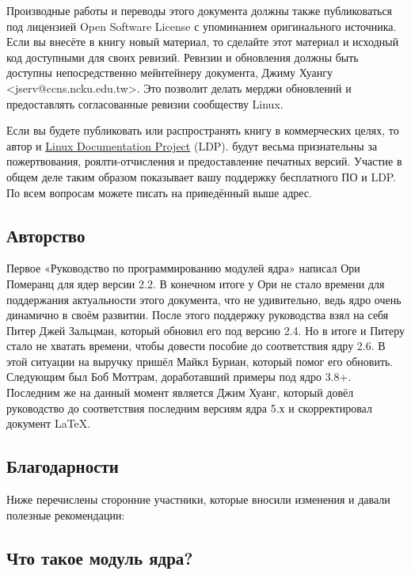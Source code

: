 \documentclass[10pt, oneside]{book}
\begin{document}
Производные работы и переводы этого документа должны также публиковаться под лицензией Open Software License с упоминанием оригинального источника. Если вы внесёте в книгу новый материал, то сделайте этот материал и исходный код доступными для своих ревизий. Ревизии и обновления должны быть доступны
непосредственно мейнтейнеру документа, Джиму Хуангу <jserv@ccns.ncku.edu.tw>. Это позволит делать мерджи обновлений и предоставлять согласованные ревизии
сообществу Linux.

Если вы будете публиковать или распространять книгу в коммерческих целях, то автор и \href{https://tldp.org/}{Linux Documentation Project} (LDP).
будут весьма признательны за пожертвования, роялти-отчисления и предоставление печатных версий. Участие в общем деле таким образом показывает вашу поддержку бесплатного ПО и LDP. По всем вопросам можете писать на приведённый выше адрес.

\subsection{Авторство}
\label{sec:authorship}

Первое «Руководство по программированию модулей ядра» написал Ори Померанц для ядер версии 2.2. В конечном итоге у Ори не стало времени для
поддержания актуальности этого документа, что не удивительно, ведь ядро очень динамично в своём развитии. После этого поддержку руководства взял на себя
Питер Джей Зальцман, который обновил его под версию 2.4. Но в итоге и Питеру стало не хватать времени, чтобы довести пособие до соответствия ядру 2.6. В этой ситуации на выручку пришёл Майкл Буриан, который помог его обновить. Следующим был Боб Моттрам, доработавший примеры под ядро 3.8+. Последним
же на данный момент является Джим Хуанг, который довёл руководство до соответствия последним версиям ядра 5.х и скорректировал документ LaTeX.

\subsection{Благодарности}
\label{sec:acknowledgements}

Ниже перечислены сторонние участники, которые вносили изменения и давали полезные рекомендации:

\begin{flushleft}

\end{flushleft}

\subsection{Что такое модуль ядра?}
\label{sec:kernelmod}
\end{document}
